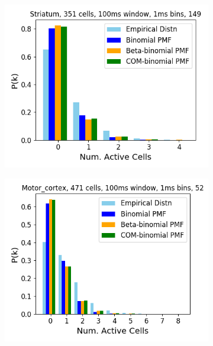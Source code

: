 \begin{figure}[p]
\begin{subfigure}[h]{0.5\linewidth}
        \includegraphics[width=\linewidth]{figures/conway_maxwell/striatum_1ms_trial_149_example.png}
        \label{fig:striatum_1ms_trial_149_example}
      \end{subfigure}
      \begin{subfigure}[h]{0.5\linewidth}
        \includegraphics[width=\linewidth]{figures/conway_maxwell/motor_cortex_1ms_trial_52_example.png}
        \label{fig:motor_cortex_1ms_trial_52_example}
      \end{subfigure}

\end{figure}
